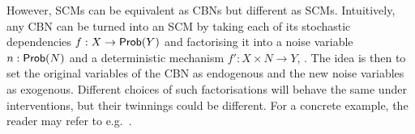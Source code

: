 \documentclass[11pt,a4paper]{article}
\begin{document}
However, SCMs can be equivalent as CBNs but different as SCMs. Intuitively, any CBN can be turned into an SCM by taking each of its stochastic dependencies $f: X \to \mathsf{Prob}(Y)$ and factorising it into a noise variable $n : \mathsf{Prob}(N)$ and a deterministic mechanism $f': X \times N \to Y$, . The idea is then to set the original variables of the CBN as endogenous and the new noise variables as exogenous. Different choices of such factorisations will behave the same under interventions, but their twinnings could be different. For a concrete example, the reader may refer to e.g.\ \cite{Balke1994,pearl2009causality}. 


\end{document}
